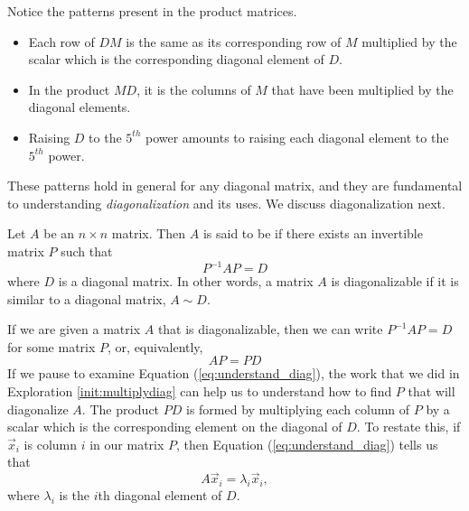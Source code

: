 \documentclass{ximera}
\begin{document}
\begin{exploration}
Notice the patterns present in the product matrices.  
\begin{itemize}
    \item Each row of $DM$ is the same as its corresponding row of $M$ multiplied by the scalar which is the corresponding diagonal element of $D$.
    \item In the product $MD$, it is the columns of $M$ that have been multiplied by the diagonal elements.
    \item Raising $D$ to the $5^{th}$ power amounts to raising each diagonal element to the $5^{th}$ power.
\end{itemize}   
These patterns hold in general for any diagonal matrix, and they are fundamental to understanding \emph{diagonalization} and its uses.  We discuss diagonalization next.
\end{exploration}

\begin{definition}\label{def:diagonalizable}
Let $A$ be an $n\times n$ matrix. Then $A$ is said to be  if there exists an invertible matrix $P$ such that
\begin{equation*}
P^{-1}AP=D
\end{equation*}
where $D$ is a diagonal matrix.  In other words, a matrix $A$ is diagonalizable if it is similar to a diagonal matrix, $A \sim D$.
\end{definition}



If we are given a matrix $A$ that is diagonalizable, then we can write $P^{-1}AP=D$ for some matrix $P$, or, equivalently,
\begin{equation}\label{eq:understand_diag}
AP=PD   
\end{equation}
If we pause to examine Equation (\ref{eq:understand_diag}), the work that we did in Exploration  \ref{init:multiplydiag} can help us to understand how to find $P$ that will diagonalize $A$. The product $PD$ is formed by multiplying each column of $P$ by a scalar which is the corresponding element on the diagonal of $D$.  To restate this, if $\vec{x}_i$ is column $i$ in our matrix $P$, then Equation (\ref{eq:understand_diag}) tells us that 
\begin{equation}\label{eq:ev_ew_diag}
A \vec{x}_i = \lambda_i \vec{x}_i,  
\end{equation}
where $\lambda_i$ is the $i$th diagonal element of $D$.  
\end{document}
